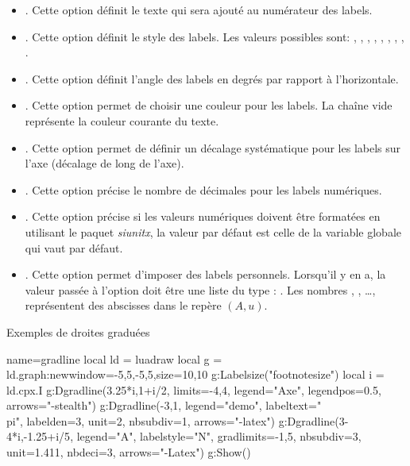 \begin{itemize}
    \item {}. Cette option définit le texte qui sera ajouté au numérateur des labels.
    
    \item {}. Cette option définit le style des labels. Les valeurs possibles sont: , , , , , , , , .
    
    \item {}. Cette option définit l'angle des labels en degrés par rapport à l'horizontale.
    
    \item {}. Cette option permet de choisir une couleur pour les labels. La chaîne vide représente la couleur courante du texte.
    
    \item {}. Cette option permet de définir un décalage systématique pour les labels sur l'axe (décalage de long de l'axe).
    
    \item {}. Cette option précise le nombre de décimales pour les labels numériques.
    
    \item {}. Cette option précise si les valeurs numériques doivent être formatées en utilisant le paquet \emph{siunitx}, la valeur par défaut est celle de la variable globale  qui vaut \false par défaut.
    
    \item {}. Cette option permet d'imposer des labels personnels. Lorsqu'il y en a, la valeur passée à l'option doit être une liste du type : . Les nombres , , \ldots, représentent des abscisses dans le repère $(A,u)$.
\end{itemize}

\begin{demo}{Exemples de droites graduées}
\begin{luadraw}{name=gradline}
local ld = luadraw
local g = ld.graph:new{window={-5,5,-5,5},size={10,10}}
g:Labelsize("footnotesize")
local i = ld.cpx.I
g:Dgradline({3.25*i,1+i/2}, {limits={-4,4}, legend="Axe", legendpos=0.5, arrows="-stealth"})
g:Dgradline({-3,1}, {legend="demo", labeltext="\\pi", labelden=3, unit=2, nbsubdiv=1, arrows="-latex"})
g:Dgradline({3-4*i,-1.25+i/5}, {legend="A", labelstyle="N", gradlimits={-1,5},
nbsubdiv=3, unit=1.411, nbdeci=3, arrows="-Latex"})
g:Show()
\end{luadraw}
\end{demo}

